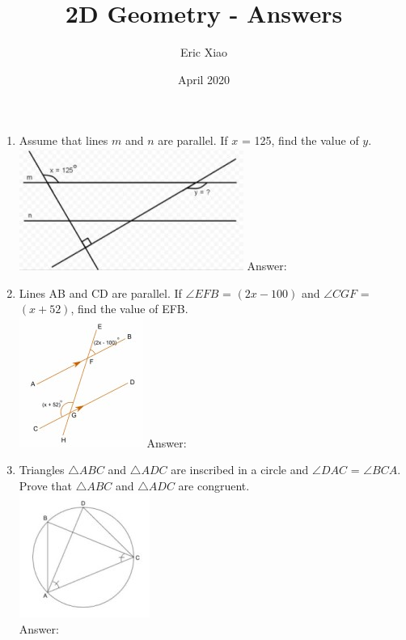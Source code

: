 \documentclass[11pt]{extarticle}
\title{2D Geometry - Answers}
\author{Eric Xiao}
\date{April 2020}
\begin{document}
\maketitle

\begin{enumerate}
    \item {Assume that lines $m$ and $n$ are parallel. If \angle $x$ = {125\textdegree}, find the value of \angle $y$.\\
    \includegraphics{April_25_Q1.jpg} Answer: \fbox{145\textdegree}}
    \item {Lines AB and CD are parallel. If $\angle EFB$ = {$(2x-100)$\textdegree} and $\angle CGF$ = {$(x+52)$\textdegree}, find the value of \angle EFB.\\
    \includegraphics{April_25_Q2.jpg} Answer: \fbox{52\textdegree}}
    \item {Triangles $\bigtriangleup ABC$ and $\bigtriangleup ADC$ are inscribed in a circle and $\angle DAC$ = $\angle BCA$. Prove that $\bigtriangleup ABC$ and $\bigtriangleup ADC$ are congruent.\\
    \includegraphics{April_25_Q3.jpg} \\Answer: }

\end{enumerate}
\end{document}
